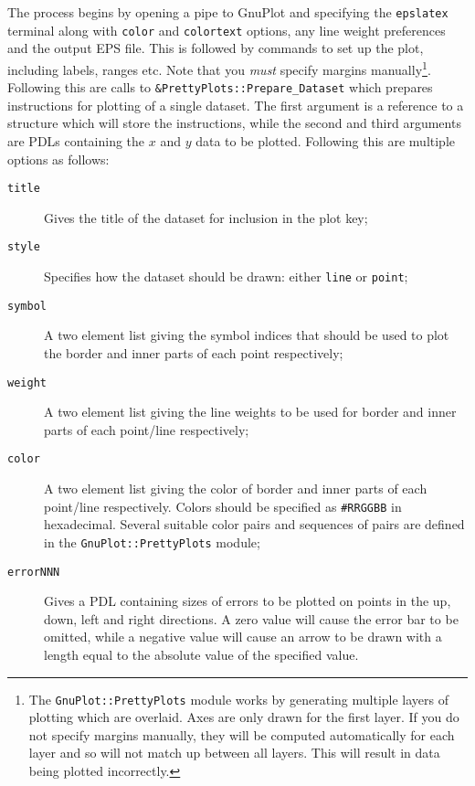 The process begins by opening a pipe to {\sc GnuPlot} and specifying the {\tt epslatex} terminal along with {\tt color} and {\tt colortext} options, any line weight preferences and the output EPS file. This is followed by commands to set up the plot, including labels, ranges etc. Note that you \emph{must} specify margins manually\footnote{The {\tt GnuPlot::PrettyPlots} module works by generating multiple layers of plotting which are overlaid. Axes are only drawn for the first layer. If you do not specify margins manually, they will be computed automatically for each layer and so will not match up between all layers. This will result in data being plotted incorrectly.}. Following this are calls to {\tt \&PrettyPlots::Prepare\_Dataset} which prepares instructions for plotting of a single dataset. The first argument is a reference to a structure which will store the instructions, while the second and third arguments are PDLs containing the $x$ and $y$ data to be plotted. Following this are multiple options as follows:
\begin{description}
\item[{\tt title}] Gives the title of the dataset for inclusion in the plot key;
\item[{\tt style}] Specifies how the dataset should be drawn: either {\tt line} or {\tt point};
\item[{\tt symbol}] A two element list giving the symbol indices that should be used to plot the border and inner parts of each point respectively;
\item[{\tt weight}] A two element list giving the line weights to be used for border and inner parts of each point/line respectively;
\item[{\tt color}] A two element list giving the color of border and inner parts of each point/line respectively. Colors should be specified as {\tt \#RRGGBB} in hexadecimal. Several suitable color pairs and sequences of pairs are defined in the {\tt GnuPlot::PrettyPlots} module;
\item[{\tt errorNNN}] Gives a PDL containing sizes of errors to be plotted on points in the up, down, left and right directions. A zero value will cause the error bar to be omitted, while a negative value will cause an arrow to be drawn with a length equal to the absolute value of the specified value.
\end{description}
